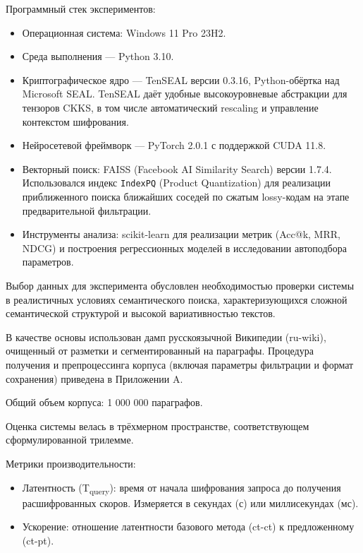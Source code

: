 \documentclass[a4paper, 12pt, oneside, openany]{article}
\begin{document}
Программный стек экспериментов:

\begin{itemize}
	\item
	Операционная система: Windows 11 Pro 23H2.
	\item
	Среда выполнения — Python 3.10.
	\item
	Криптографическое ядро — TenSEAL версии 0.3.16, Python-обёртка над Microsoft SEAL. TenSEAL даёт удобные высокоуровневые абстракции для тензоров CKKS, в том числе автоматический rescaling и управление контекстом шифрования.
	\item
	Нейросетевой фреймворк — PyTorch 2.0.1 с поддержкой CUDA 11.8.
	\item
	Векторный поиск: FAISS (Facebook AI Similarity Search) версии 1.7.4. Использовался индекс \texttt{IndexPQ} (Product Quantization) для реализации приближенного поиска ближайших соседей по сжатым lossy-кодам на этапе предварительной фильтрации.
	\item
	Инструменты анализа: scikit-learn для реализации метрик (Acc@k, MRR, NDCG) и построения регрессионных моделей в исследовании автоподбора параметров.
\end{itemize}

Выбор данных для эксперимента обусловлен необходимостью проверки системы в реалистичных условиях семантического поиска, характеризующихся сложной семантической структурой и высокой вариативностью текстов.


	В качестве основы использован дамп русскоязычной Википедии (ru-wiki), очищенный от разметки и сегментированный на параграфы. Процедура получения и препроцессинга корпуса (включая параметры фильтрации и формат сохранения) приведена в Приложении A.

	Общий объем корпуса: 1 000 000 параграфов.



Оценка системы велась в трёхмерном пространстве, соответствующем сформулированной трилемме.

Метрики производительности:


\begin{itemize}
	\item
	Латентность (T\textsubscript{query}): время от начала шифрования запроса до получения расшифрованных скоров. Измеряется в секундах (с) или миллисекундах (мс).
	\item
	Ускорение: отношение латентности базового метода (ct-ct) к предложенному (ct-pt).
	
\end{itemize}
	
\end{document}
